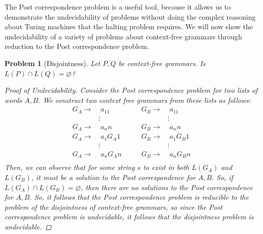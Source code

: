 \documentclass[psamsfonts]{amsart}
\newtheorem{prob}[thm]{Problem}
\theoremstyle{definition}
\theoremstyle{remark}
\numberwithin{equation}{section}
\begin{document}
The Post correspondence problem is a useful tool, because it allows us to
demonstrate the undecidability of problems without doing the complex reasoning
about Turing machines that the halting problem requires. We will now show the
undecidability of a variety of problems about context-free grammars through
reduction to the Post correspondence problem.

\begin{prob}[Disjointness]
  \label{prob:disjointness}
  Let $P,Q$ be context-free grammars. Is $L(P)\cap L(Q) = \varnothing$?
  \begin{proof}[Proof of Undecidability]
    Consider the Post correspondence problem for two lists of words $A,B$. We
    construct two context free grammars from these lists as follows:
    \begin{equation*}
      \begin{split}
        G_A \rightarrow  &\;a_11 \\
        &\!\!\!\!\vdots \\
        G_A \rightarrow  &\;a_nn \\
        G_A \rightarrow  &\;a_1G_A1 \\
        &\!\!\!\!\vdots \\
        G_A \rightarrow  &\;a_nG_An \\
      \end{split}
      \qquad
      \begin{split}
        G_B \rightarrow  &\;a_11 \\
        &\!\!\!\!\vdots \\
        G_B \rightarrow  &\;a_nn \\
        G_B \rightarrow  &\;a_1G_B1 \\
        &\!\!\!\!\vdots \\
        G_B \rightarrow  &\;a_nG_Bn \\
      \end{split}
    \end{equation*}
    Then, we can observe that for some string $s$ to exist in both $L(G_A)$ and $L(G_B)$,
    it must be a solution to the Post correspondence for $A,B$. So, if $L(G_A)\cap
    L(G_B)=\varnothing$, then there are no solutions to the Post correspondence
    for $A,B$. So, it follows that the Post correspondence problem is reducible
    to the problem of the disjointness of context-free grammars, so since the
    Post correspondence problem is undecidable, it follows that the disjointness
    problem is undecidable.
  \end{proof}
\end{prob}
\end{document}
